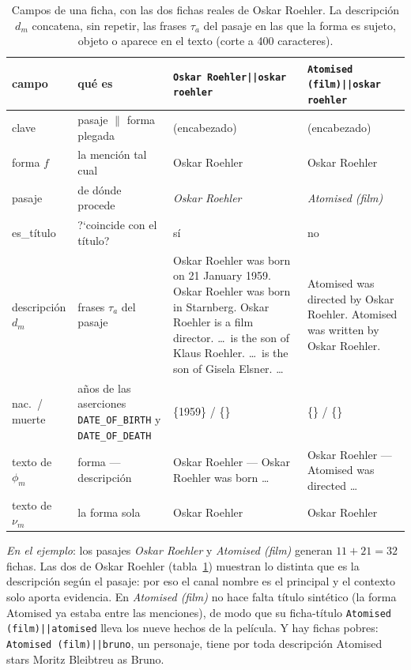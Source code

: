 \documentclass[11pt,a4paper]{article}
\begin{document}
\begin{table}[t]
\centering\footnotesize\setlength{\tabcolsep}{4pt}
\caption{Campos de una ficha, con las dos fichas reales de Oskar Roehler.
La descripción $d_m$ concatena, sin repetir, las frases $\tau_a$ del pasaje
en las que la forma es sujeto, objeto o aparece en el texto (corte a 400
caracteres).}
\label{tab:ficha}
\begin{tabular}{l>{\raggedright\arraybackslash}p{}>{\raggedright\arraybackslash}p{}>{\raggedright\arraybackslash}p{}}
\toprule
campo & qué es & \texttt{Oskar Roehler||oskar roehler} & \texttt{Atomised (film)||oskar roehler}\\
\midrule
clave & pasaje $\|$ forma plegada & (encabezado) & (encabezado)\\
forma $f$ & la mención tal cual & Oskar Roehler & Oskar Roehler\\
pasaje & de dónde procede & \emph{Oskar Roehler} & \emph{Atomised (film)}\\
es\_título & ?`coincide con el título? & sí & no\\
descripción $d_m$ & frases $\tau_a$ del pasaje & \guillemotleft{}Oskar Roehler was born on 21 January
  1959. Oskar Roehler was born in Starnberg. Oskar Roehler is a film director.
  \dots\ is the son of Klaus Roehler. \dots\ is the son of Gisela Elsner. \dots\guillemotright{}
  & \guillemotleft{}Atomised was directed by Oskar Roehler. Atomised was written by Oskar
  Roehler.\guillemotright{}\\
nac.\ / muerte & años de las aserciones \texttt{DATE\_OF\_BIRTH} y \texttt{DATE\_OF\_DEATH} & \{1959\} / \{\} & \{\} / \{\}\\
texto de $\phi_m$ & \guillemotleft{}forma --- descripción\guillemotright{} & \guillemotleft{}Oskar Roehler --- Oskar Roehler was
  born \dots\guillemotright{} & \guillemotleft{}Oskar Roehler --- Atomised was directed \dots\guillemotright{}\\
texto de $\nu_m$ & la forma sola & \guillemotleft{}Oskar Roehler\guillemotright{} & \guillemotleft{}Oskar Roehler\guillemotright{}\\
\bottomrule
\end{tabular}
\end{table}

\emph{En el ejemplo}: los pasajes \emph{Oskar Roehler} y \emph{Atomised
(film)} generan $11 + 21 = 32$ fichas. Las dos de Oskar Roehler
(tabla~\ref{tab:ficha}) muestran lo distinta que es la descripción según el
pasaje: por eso el canal nombre es el principal y el contexto solo aporta
evidencia. En \emph{Atomised (film)} no hace falta título sintético (la
forma \guillemotleft{}Atomised\guillemotright{} ya estaba entre las menciones), de modo que su
ficha-título \texttt{Atomised (film)||atomised} lleva los nueve hechos de
la película. Y hay fichas pobres: \texttt{Atomised (film)||bruno}, un
personaje, tiene por toda descripción \guillemotleft{}Atomised stars Moritz Bleibtreu as
Bruno.\guillemotright{}
\end{document}
